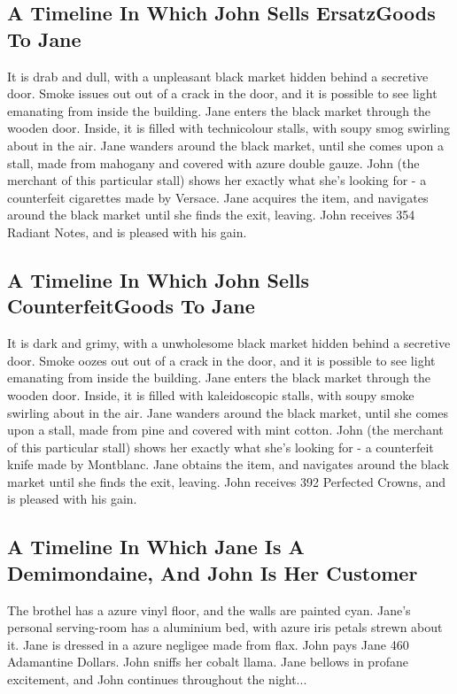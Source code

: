 \documentclass{article}
\begin{document}
\subsection{A Timeline In Which John Sells ErsatzGoods To Jane}


It is drab and dull, with a unpleasant black market hidden behind a secretive door.
Smoke issues out out of a crack in the door, and it is possible to see light emanating from inside the building.
Jane enters the black market through the wooden door.
Inside, it is filled with technicolour stalls, with soupy smog swirling about in the air.
Jane wanders around the black market, until she comes upon a stall, made from mahogany and covered with azure double gauze.
John (the merchant of this particular stall) shows her exactly what she's looking for {-} a counterfeit cigarettes made by Versace.
Jane acquires the item, and navigates around the black market until she finds the exit, leaving.
John receives 354 Radiant Notes, and is pleased with his gain.
\subsection{A Timeline In Which John Sells CounterfeitGoods To Jane}


It is dark and grimy, with a unwholesome black market hidden behind a secretive door.
Smoke oozes out out of a crack in the door, and it is possible to see light emanating from inside the building.
Jane enters the black market through the wooden door.
Inside, it is filled with kaleidoscopic stalls, with soupy smoke swirling about in the air.
Jane wanders around the black market, until she comes upon a stall, made from pine and covered with mint cotton.
John (the merchant of this particular stall) shows her exactly what she's looking for {-} a counterfeit knife made by Montblanc.
Jane obtains the item, and navigates around the black market until she finds the exit, leaving.
John receives 392 Perfected Crowns, and is pleased with his gain.
\subsection{A Timeline In Which Jane Is A Demimondaine, And John Is Her Customer}


The brothel has a azure vinyl floor, and the walls are painted cyan.
Jane's personal serving{-}room has a aluminium bed, with azure iris petals strewn about it.
Jane is dressed in a azure negligee made from flax.
John pays Jane 460 Adamantine Dollars.
John sniffs her cobalt llama.
Jane bellows in profane excitement, and John continues throughout the night...
\end{document}
